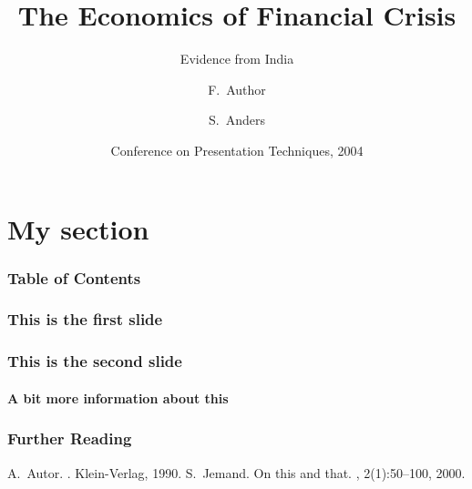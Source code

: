 \documentclass[xetex]{beamer}
\begin{document}
	\title[Crisis] %
    {The Economics of Financial Crisis}
    \subtitle{Evidence from India}
    \author[Author, Anders] %
    {F.~Author \and S.~Anders}
    \date[KPT 2004] %
    {Conference on Presentation Techniques, 2004}
    \subject{Computer Science}
	\frame{\titlepage}

	\section[Section]{My section}
	\begin{frame}
        \frametitle{Table of Contents}
        \tableofcontents
    \end{frame}
    \begin{frame}
    	\frametitle{This is the first slide}
    \end{frame}
    \begin{frame}
   		\frametitle{This is the second slide}
    	\framesubtitle{A bit more information about this}
    \end{frame}
    \begin{frame}[allowframebreaks]
  		\frametitle<presentation>{Further Reading}    
  	\begin{thebibliography}{10}    
  	\beamertemplatebookbibitems
    	A.~Autor.
    	.
    	\newblock Klein-Verlag, 1990.
  	\beamertemplatearticlebibitems
    	S.~Jemand.
    	\newblock On this and that.
    	, 2(1):50--100, 2000.
  	\end{thebibliography}
	\end{frame}
\end{document}
